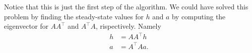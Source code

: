 \begin{enumerate}
  Notice that this is just the first step of the algorithm. We could have solved
  this problem by finding the steady-state values for $h$ and $a$ by computing
  the eigenvector for $AA^\top$ and $A^\top A$, rispectively. Namely
  \begin{align*}
    h &= AA^\top h \\
    a &= A^\top A a.
  \end{align*}

\end{enumerate}
